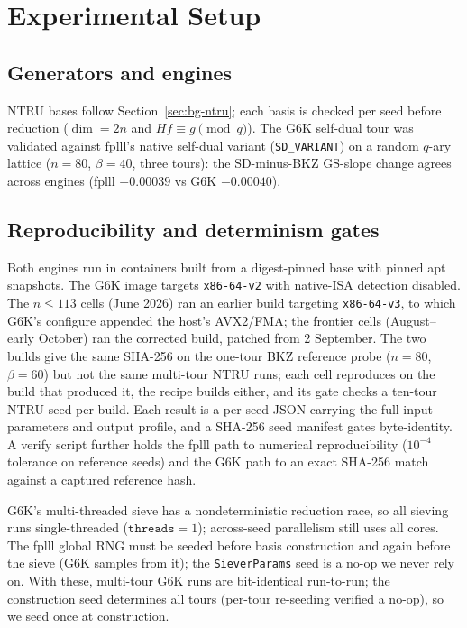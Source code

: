 \documentclass[journal=cic,version=preprint]{iacrj}
\begin{document}
\section{Experimental Setup}
\label{sec:setup}

\subsection{Generators and engines}
\label{sec:setup-engines}
NTRU bases follow Section~\ref{sec:bg-ntru}; each basis is checked per seed
before reduction ($\dim=2n$ and $H\!f\equiv g\pmod q$).
The G6K self-dual tour was validated
against fplll's native self-dual variant (\texttt{SD\_VARIANT}) on a random $q$-ary lattice ($n=80$,
$\beta=40$, three tours): the SD-minus-BKZ GS-slope change agrees across
engines (fplll $-0.00039$ vs G6K $-0.00040$).

\subsection{Reproducibility and determinism gates}
\label{sec:setup-repro}
Both engines run in containers built from a digest-pinned base with
pinned apt snapshots. The G6K image targets \texttt{x86-64-v2} with
native-ISA detection disabled. The $n\le113$ cells (June 2026) ran an
earlier build targeting \texttt{x86-64-v3}, to which G6K's configure appended the host's AVX2/FMA; the frontier cells (August--early October) ran the corrected build,
patched from 2 September. The two builds give the same SHA-256 on the one-tour BKZ reference probe ($n=80$, $\beta=60$) but not the same multi-tour NTRU runs; each cell reproduces on the build that produced it, the recipe builds either, and its gate checks a ten-tour NTRU seed per build.
Each result is a per-seed JSON
carrying the full input parameters and output profile, and a SHA-256 seed
manifest gates byte-identity. A verify script further holds the
fplll path to numerical reproducibility ($10^{-4}$ tolerance on reference
seeds) and the G6K path to an exact SHA-256
match against a captured reference hash.

G6K's multi-threaded
sieve has a nondeterministic reduction race, so all sieving runs single-threaded
($\texttt{threads}=1$); across-seed parallelism still uses all cores. The
fplll global RNG must be seeded before basis construction and again before the
sieve (G6K samples from it); the \texttt{SieverParams} seed is a no-op we never
rely on. With these, multi-tour G6K runs are bit-identical run-to-run; the
construction seed determines all tours (per-tour re-seeding verified a
no-op), so we seed once at construction.
\end{document}
